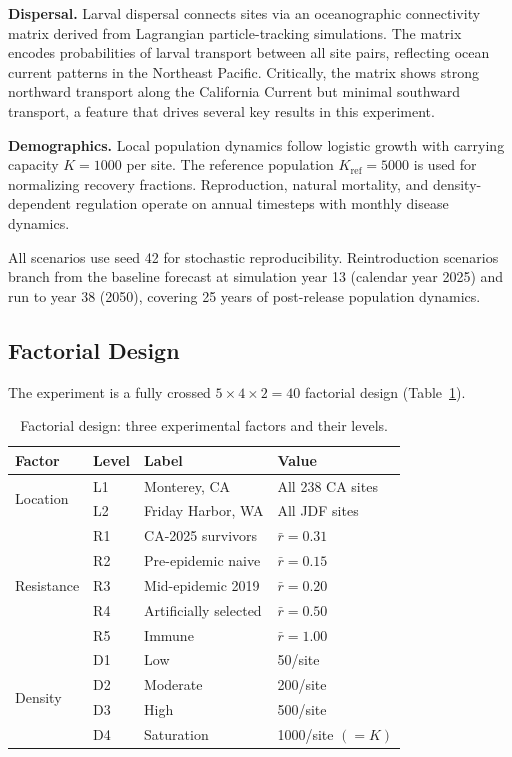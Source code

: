 \documentclass[11pt,a4paper]{article}
\newcommand{\rbar}{\ensuremath{\bar{r}}}
\begin{document}
\textbf{Dispersal.} Larval dispersal connects sites via an oceanographic connectivity matrix derived from Lagrangian particle-tracking simulations. The matrix encodes probabilities of larval transport between all site pairs, reflecting ocean current patterns in the Northeast Pacific. Critically, the matrix shows strong northward transport along the California Current but minimal southward transport, a feature that drives several key results in this experiment.

\textbf{Demographics.} Local population dynamics follow logistic growth with carrying capacity $K=1000$ per site. The reference population $K_\text{ref}=5000$ is used for normalizing recovery fractions. Reproduction, natural mortality, and density-dependent regulation operate on annual timesteps with monthly disease dynamics.

All scenarios use seed 42 for stochastic reproducibility. Reintroduction scenarios branch from the baseline forecast at simulation year 13 (calendar year 2025) and run to year 38 (2050), covering 25 years of post-release population dynamics.

\subsection{Factorial Design}

The experiment is a fully crossed $5 \times 4 \times 2 = 40$ factorial design (Table~\ref{tab:design}).

\begin{table}[H]
\centering
\caption{Factorial design: three experimental factors and their levels.}
\label{tab:design}
\begin{tabular}{llll}
\toprule
\textbf{Factor} & \textbf{Level} & \textbf{Label} & \textbf{Value} \\
\midrule
\multirow{2}{*}{Location} & L1 & Monterey, CA & All 238 CA sites \\
                           & L2 & Friday Harbor, WA & All JDF sites \\
\midrule
\multirow{5}{*}{Resistance} & R1 & CA-2025 survivors & $\rbar = 0.31$ \\
                             & R2 & Pre-epidemic naive & $\rbar = 0.15$ \\
                             & R3 & Mid-epidemic 2019  & $\rbar = 0.20$ \\
                             & R4 & Artificially selected & $\rbar = 0.50$ \\
                             & R5 & Immune & $\rbar = 1.00$ \\
\midrule
\multirow{4}{*}{Density}  & D1 & Low & 50/site \\
                           & D2 & Moderate & 200/site \\
                           & D3 & High & 500/site \\
                           & D4 & Saturation & 1000/site $(=K)$ \\
\bottomrule
\end{tabular}
\end{table}
\end{document}

